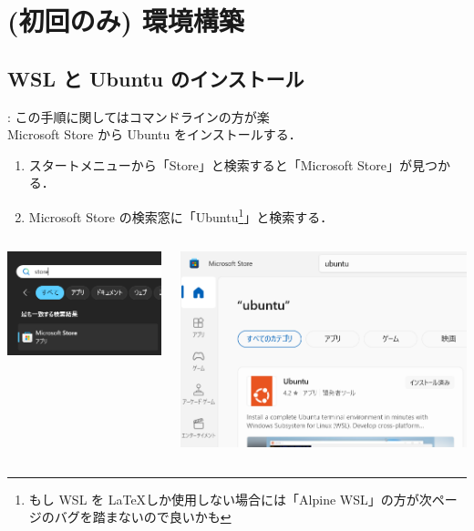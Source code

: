 \documentclass[aspectratio=169,dvipdfmx,cjk]{beamer}
\begin{document}
\section{(初回のみ) 環境構築}

\subsection{WSL と Ubuntu のインストール}
\begin{frame}{\insertsection \thesubsection: \insertsubsection}
  この手順に関してはコマンドラインの方が楽 \hyperlink{appendix:wsl}{}\\
  Microsoft Store から Ubuntu をインストールする．
  \begin{enumerate}
    \item スタートメニューから「Store」と検索すると「Microsoft Store」が見つかる．
    \item Microsoft Store の検索窓に「Ubuntu\footnote{もし WSL を \LaTeX しか使用しない場合には「Alpine WSL」の方が次ページのバグを踏まないので良いかも}」と検索する．
  \end{enumerate}
  \begin{columns}
    \begin{column}{0.4\textwidth}
        \includegraphics[width=1.0\linewidth]{fig/store.png}
    \end{column}
    \begin{column}{0.4\textwidth}
      \includegraphics[width=1.0\linewidth]{fig/store-ubuntu.png}

\end{column}
\end{columns}
\end{frame}
\end{document}
